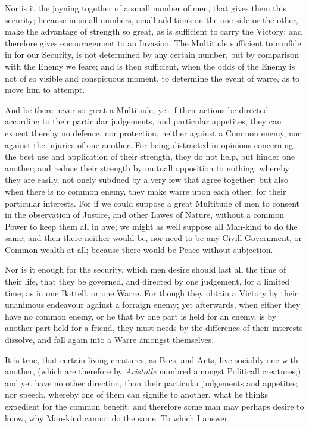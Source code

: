 Nor is it the joyning together of a small number of men, that gives
them this security; because in small numbers, small additions on the
one side or the other, make the advantage of strength so great, as is
sufficient to carry the Victory; and therefore gives encouragement to
an Invasion. The Multitude sufficient to confide in for our Security,
is not determined by any certain number, but by comparison with the
Enemy we feare; and is then sufficient, when the odds of the Enemy is
not of so visible and conspicuous moment, to determine the event of
warre, as to move him to attempt.

And be there never so great a Multitude; yet if their actions be
directed according to their particular judgements, and particular
appetites, they can expect thereby no defence, nor protection, neither
against a Common enemy, nor against the injuries of one another. For
being distracted in opinions concerning the best use and application
of their strength, they do not help, but hinder one another; and
reduce their strength by mutuall opposition to nothing: whereby they
are easily, not onely subdued by a very few that agree together; but
also when there is no common enemy, they make warre upon each other,
for their particular interests. For if we could suppose a great
Multitude of men to consent in the observation of Justice, and other
Lawes of Nature, without a common Power to keep them all in awe; we
might  as well suppose all Man-kind to do the same; and then
there neither would be, nor need to be any Civill Government, or
Common-wealth at all; because there would be Peace without subjection.

Nor is it enough for the security, which men desire should last all
the time of their life, that they be governed, and directed by one
judgement, for a limited time; as in one Battell, or one Warre. For
though they obtain a Victory by their unanimous endeavour against a
forraign enemy; yet afterwards, when either they have no common enemy,
or he that by one part is held for an enemy, is by another part held
for a friend, they must needs by the difference of their interests
dissolve, and fall again into a Warre amongst themselves.

It is true, that certain living creatures, as Bees, and Ants, live
sociably one with another, (which are therefore by \textit{Aristotle}
numbred amongst Politicall creatures;) and yet have no other
direction, than their particular judgements and appetites; nor speech,
whereby one of them can signifie to another, what he thinks expedient
for the common benefit: and therefore some man may perhaps desire to
know, why Man-kind cannot do the same. To which I answer,

